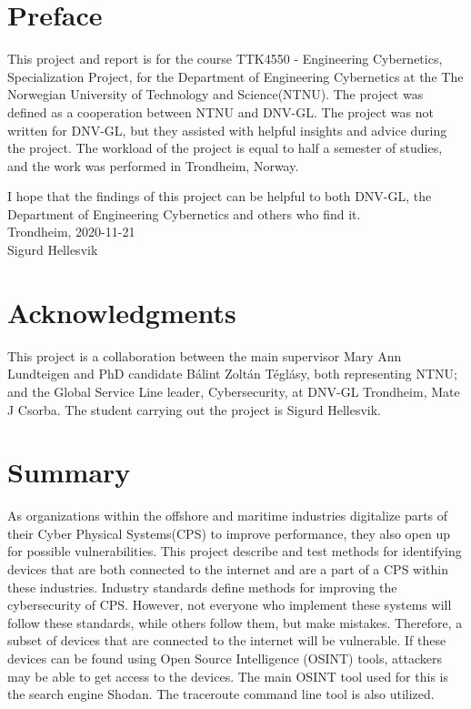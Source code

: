\section*{Preface}
This project and report is for the course TTK4550 - Engineering Cybernetics, Specialization Project, for the Department of Engineering Cybernetics at the The Norwegian University of Technology and Science(NTNU). The project was defined as a cooperation between NTNU and DNV-GL. The project was not written for DNV-GL, but they assisted with helpful insights and advice during the project. The workload of the project is equal to half a semester of studies, and the work was performed in Trondheim, Norway.

I hope that the findings of this project can be helpful to both DNV-GL, the Department of Engineering Cybernetics and others who find it. 
\\
Trondheim, 2020-11-21
\\
Sigurd Hellesvik
\newpage

\section*{Acknowledgments} \label{sec:ack}
This project is a collaboration between the main supervisor Mary Ann Lundteigen and PhD candidate Bálint Zoltán Téglásy, both representing NTNU; and the Global Service Line leader, Cybersecurity, at DNV-GL Trondheim,  Mate J Csorba. The student carrying out the project is Sigurd Hellesvik.

\section*{Summary}

As organizations within the offshore and maritime industries digitalize parts of their Cyber Physical Systems(CPS) to improve performance, they also open up for possible vulnerabilities. This project describe and test methods for identifying devices that are both connected to the internet and are a part of a CPS within these industries. 
Industry standards define methods for improving the cybersecurity of CPS. However, not everyone who implement these systems will follow these standards, while others follow them, but make mistakes. Therefore, a subset of devices that are connected to the internet will be vulnerable. If these devices can be found using Open Source Intelligence (OSINT) tools, attackers may be able to get access to the devices. 
The main OSINT tool used for this is the search engine Shodan. The traceroute command line tool is also utilized.

